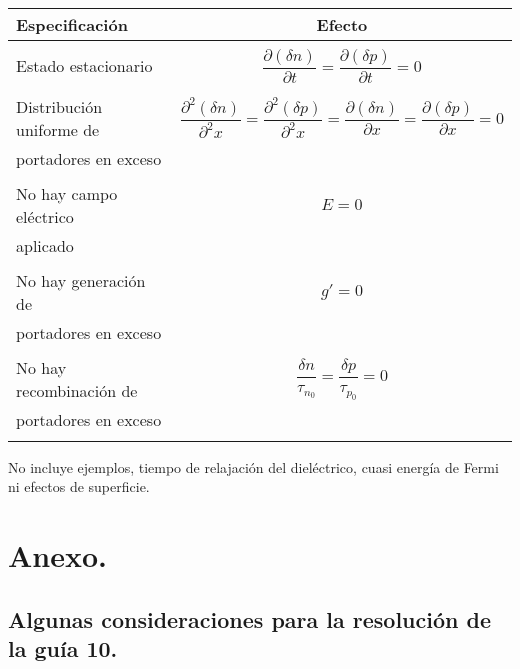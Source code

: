 \documentclass[12pt,a4paper]{article}
\begin{document}
\begin{center}
\begin{tabular}{|l|c|} \hline
Especificación & Efecto \\ \hline
 & \\
Estado estacionario & $\dfrac{\partial (\delta n)}{\partial t}=\dfrac{\partial (\delta p)}{\partial t}=0$ \\
 & \\
Distribución uniforme de & $\dfrac{\partial^{2} (\delta n)}{\partial^{2} x}=\dfrac{\partial^{2} (\delta p)}{\partial^{2} x}=\dfrac{\partial (\delta n)}{\partial x}=\dfrac{\partial (\delta p)}{\partial x}=0$ \\
portadores en exceso & \\
 & \\
No hay campo eléctrico & $E=0$ \\
aplicado & \\
 & \\
No hay generación de & $g'=0$ \\
portadores en exceso & \\
 & \\
No hay recombinación de & $\dfrac{\delta n}{\tau _{n_{0}}}=\dfrac{\delta p}{\tau _{p_{0}}}=0$ \\
portadores en exceso & \\
 & \\ \hline
\end{tabular}
\end{center}

\scriptsize{No incluye ejemplos, tiempo de relajación del dieléctrico, cuasi energía de Fermi ni efectos de superficie.}

\section{Anexo.}

\subsection*{Algunas consideraciones para la resolución de la guía 10.}
\end{document}
